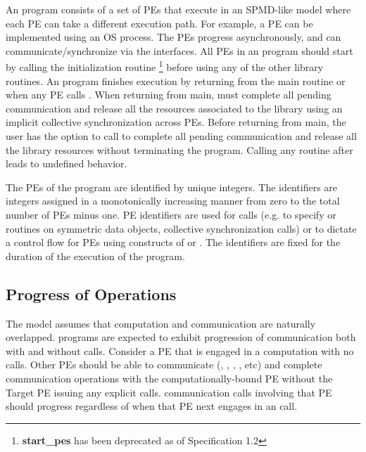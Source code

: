 An \openshmem program consists of a set of \acp{PE}
that execute in an \ac{SPMD}-like model where each \ac{PE} can take a different
execution path. For example, a \ac{PE} can be implemented using an OS
process.  The \acp{PE} progress asynchronously, and can communicate/synchronize
via the \openshmem interfaces.  All \acp{PE} in an \openshmem program should
start by calling the initialization routine  
\footnote{\textbf{start\_pes} has been deprecated as of Specification 1.2}
before using any of the other \openshmem library routines.  An \openshmem
program finishes execution by returning from the main routine or when any PE
calls . When returning from main, \openshmem must
complete all pending communication and release all the resources associated to
the library using an implicit collective synchronization across PEs. Before returning 
from main, the user has the option to call  to
complete all pending communication and release all the \openshmem library
resources without terminating the program. Calling any \openshmem routine after
 leads to undefined behavior.

The \acp{PE} of the \openshmem program are identified by unique integers.  The
identifiers are integers assigned in a monotonically increasing manner from zero
to the total number of \acp{PE} minus one. \ac{PE} identifiers are used for
\openshmem calls (e.g. to specify  or  routines on symmetric
data objects, collective synchronization calls) or to dictate a control flow for
\acp{PE} using constructs of \Cstd or \Fortran. The identifiers are fixed for
the duration of the execution of the \openshmem program.

\subsection{Progress of \openshmem Operations}\label{subsec:progress}

The \openshmem model assumes that computation and communication are naturally
overlapped. \openshmem programs are expected to exhibit progression of
communication both with and without \openshmem calls. Consider a \ac{PE} that is
engaged in a computation with no \openshmem calls. Other \acp{PE} should be able
to communicate (, , , , etc) and
complete communication operations with the computationally-bound \ac{PE}
without the Target \ac{PE} issuing any explicit \openshmem calls. \openshmem
communication calls involving that \ac{PE} should progress regardless of when
that \ac{PE} next engages in an \openshmem call.


